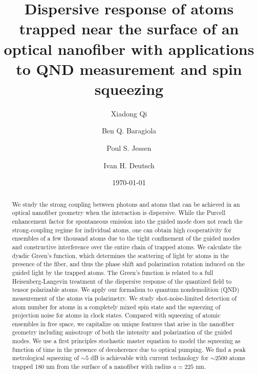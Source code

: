 \documentclass[aps,pra,twocolumn]{revtex4-1} %
\begin{document}
\title{Dispersive response of atoms trapped near the surface of an optical nanofiber with applications to QND measurement and spin squeezing}
\author{Xiadong Qi}
\author{Ben Q. Baragiola}
\author{Poul S. Jessen}
\author{Ivan H. Deutsch}
\date{\today}

\begin{abstract}
We study the strong coupling between photons and atoms that can be achieved in an optical nanofiber geometry when the interaction is dispersive.  While the Purcell enhancement factor for spontaneous emission into the guided mode does not reach the strong-coupling regime for individual atoms, one can obtain high cooperativity for ensembles of a few thousand atoms due to the tight confinement of the guided modes and constructive interference over the entire chain of trapped atoms. We calculate the dyadic Green's function, which determines the scattering of light by atoms in the presence of the fiber, and thus the phase shift and polarization rotation induced on the guided light by the trapped atoms.  The Green's function is related to a full Heisenberg-Langevin treatment of the dispersive response of the quantized field to tensor polarizable atoms.  We apply our formalism to quantum nondemolition (QND) measurement of the atoms via polarimetry.  We study shot-noise-limited detection of atom number for atoms in a completely mixed spin state and the squeezing of projection noise for atoms in clock states.  Compared with squeezing of atomic ensembles in free space, we capitalize on unique features that arise in the nanofiber geometry including anisotropy of both the intensity and polarization of the guided modes.  We use a first principles stochastic master equation to model the squeezing as function of time in the presence of decoherence due to optical pumping.  We find a peak metrological squeezing of $\sim 5$ dB is achievable with current technology for $\sim 2500$ atoms trapped 180 nm from the surface of a nanofiber with radius $a=225$ nm.  
\end{abstract}
\end{document}
